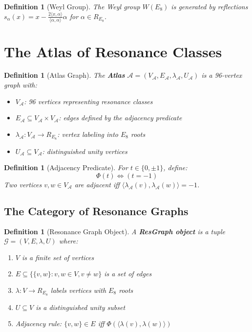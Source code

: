 \documentclass[12pt]{article}
\newtheorem{definition}[theorem]{Definition}
\newcommand{\A}{\mathcal{A}}
\newcommand{\G}{\mathcal{G}}
\newcommand{\Weyl}{W}
\newcommand{\PhiAdj}{\Phi}
\begin{document}
\begin{definition}[Weyl Group]
The Weyl group $\Weyl(E_8)$ is generated by reflections $s_\alpha(x) = x - \frac{2\langle x, \alpha\rangle}{\langle \alpha, \alpha\rangle} \alpha$ for $\alpha \in R_{E_8}$.
\end{definition}

\section{The Atlas of Resonance Classes}

\begin{definition}[Atlas Graph]
The \textbf{Atlas} $\A = (V_\A, E_\A, \lambda_\A, U_\A)$ is a 96-vertex graph with:
\begin{itemize}
\item $V_\A$: 96 vertices representing resonance classes
\item $E_\A \subseteq V_\A \times V_\A$: edges defined by the adjacency predicate
\item $\lambda_\A: V_\A \to R_{E_8}$: vertex labeling into $E_8$ roots
\item $U_\A \subseteq V_\A$: distinguished unity vertices
\end{itemize}
\end{definition}

\begin{definition}[Adjacency Predicate]
For $t \in \{0, \pm1\}$, define:
\[
\PhiAdj(t) \iff (t = -1)
\]
Two vertices $v, w \in V_\A$ are adjacent iff $\langle \lambda_\A(v), \lambda_\A(w) \rangle = -1$.
\end{definition}

\subsection{The Category of Resonance Graphs}

\begin{definition}[Resonance Graph Object]
A \textbf{ResGraph object} is a tuple $\G = (V, E, \lambda, U)$ where:
\begin{enumerate}
\item $V$ is a finite set of vertices
\item $E \subseteq \{\{v,w\} : v,w \in V, v \neq w\}$ is a set of edges
\item $\lambda: V \to R_{E_8}$ labels vertices with $E_8$ roots
\item $U \subseteq V$ is a distinguished unity subset
\item Adjacency rule: $\{v,w\} \in E$ iff $\PhiAdj(\langle \lambda(v), \lambda(w) \rangle)$
\end{enumerate}
\end{definition}
\end{document}

